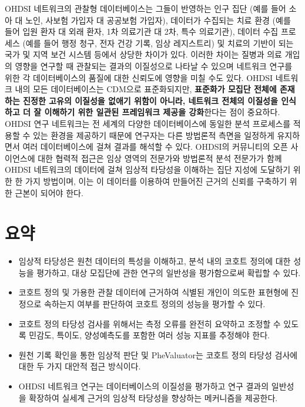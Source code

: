 \documentclass[10.5pt]{book}
\providecommand{\tightlist}{%
  \setlength{\itemsep}{0pt}\setlength{\parskip}{0pt}}
\theoremstyle{definition}
\theoremstyle{definition}
\theoremstyle{definition}
\theoremstyle{remark}
\let\BeginKnitrBlock\begin \let\EndKnitrBlock\end
\begin{document}
OHDSI 네트워크의 관찰형 데이터베이스는 그들이 반영하는 인구 집단 (예를
들어 소아 대 노인, 사보험 가입자 대 공공보험 가입자), 데이터가 수집되는
치료 환경 (예를 들어 입원 환자 대 외래 환자, 1차 의료기관 대 2차, 특수
의료기관), 데이터 수집 프로세스 (예를 들어 행정 청구, 전자 건강 기록,
임상 레지스트리) 및 치료의 기반이 되는 국가 및 지역 보건 시스템 등에서
상당한 차이가 있다. 이러한 차이는 질병과 의료 개입의 영향을 연구할 때
관찰되는 결과의 이질성으로 나타날 수 있으며 네트워크 연구를 위한 각
데이터베이스의 품질에 대한 신뢰도에 영향을 미칠 수도 있다. OHDSI
네트워크 내의 모든 데이터베이스는 CDM으로 표준화되지만, \textbf{표준화가
모집단 전체에 존재하는 진정한 고유의 이질성을 없애기 위함이 아니라,
네트워크 전체의 이질성을 인식하고 더 잘 이해하기 위한 일관된 프레임워크
제공을 강화}한다는 점이 중요하다. OHDSI 연구 네트워크는 전 세계의 다양한
데이터베이스에 동일한 분석 프로세스를 적용할 수 있는 환경을 제공하기
때문에 연구자는 다른 방법론적 측면을 일정하게 유지하면서 여러
데이터베이스에 걸쳐 결과를 해석할 수 있다. OHDSI의 커뮤니티의 오픈
사이언스에 대한 협력적 접근은 임상 영역의 전문가와 방법론적 분석
전문가가 함께 OHDSI 네트워크의 데이터에 걸쳐 임상적 타당성을 이해하는
집단 지성에 도달하기 위한 한 가지 방법이며, 이는 이 데이터를 이용하여
만들어진 근거의 신뢰를 구축하기 위한 근본이 되어야 한다.

\section{요약}\label{-14}

\BeginKnitrBlock{rmdsummary}
\begin{itemize}
\tightlist
\item
  임상적 타당성은 원천 데이터의 특성을 이해하고, 분석 내의 코호트 정의에
  대한 성능을 평가하고, 대상 모집단에 관한 연구의 일반성을 평가함으로써
  확립할 수 있다.
\item
  코호트 정의 및 가용한 관찰 데이터에 근거하여 식별된 개인이 의도한
  표현형에 진정으로 속하는지 여부를 판단하여 코호트 정의의 성능을 평가할
  수 있다.
\item
  코호트 정의 타당성 검사를 위해서는 측정 오류를 완전히 요약하고 조정할
  수 있도록 민감도, 특이도, 양성예측도를 포함한 여러 성능 지표를
  추정해야 한다.
\item
  원천 기록 확인을 통한 임상적 판단 및 PheValuator는 코호트 정의 타당성
  검사에 대한 두 가지 대안적 접근 방식이다.
\item
  OHDSI 네트워크 연구는 데이터베이스의 이질성을 평가하고 연구 결과의
  일반성을 확장하여 실세계 근거의 임상적 타당성을 향상하는 메커니즘을
  제공한다.
\end{itemize}
\EndKnitrBlock{rmdsummary}
\end{document}
